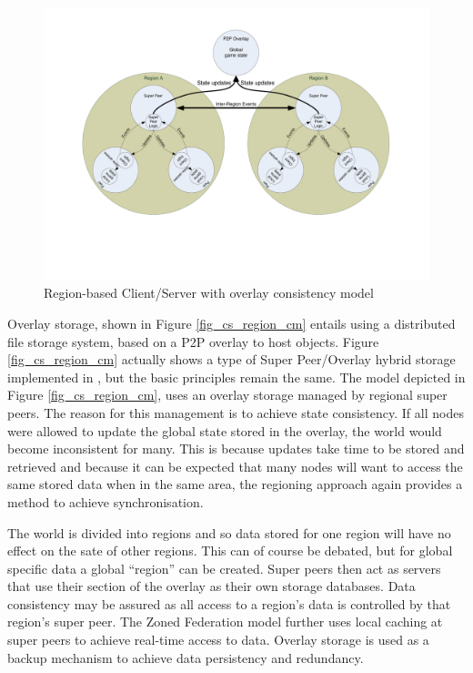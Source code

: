 \documentclass[journal,oneside,a4paper,onecolumn]{IEEEtran}
\begin{document}
\begin{figure}[htbp]
 \centering
 \includegraphics[clip=true, viewport=2cm 5cm 27cm 19.5cm, width=\columnwidth]{region_based_CS_CM_P2PO}
 \caption{Region-based Client/Server with overlay consistency model}
 \label{fig_cs_region_o_cm}
\end{figure}
%
Overlay storage, shown in Figure \ref{fig_cs_region_cm} entails using a distributed file storage system, based on a P2P overlay to host objects. Figure \ref{fig_cs_region_cm} actually shows a type of Super Peer/Overlay hybrid storage implemented in \cite{zoned_federation}, but the basic principles remain the same. The model depicted in Figure \ref{fig_cs_region_cm}, uses an overlay storage managed by regional super peers. The reason for this management is to achieve state consistency. If all nodes were allowed to update the global state stored in the overlay, the world would become inconsistent for many. This is because updates take time to be stored and retrieved and because it can be expected that many nodes will want to access the same stored data when in the same area, the regioning approach again provides a method to achieve synchronisation.

The world is divided into regions and so data stored for one region will have no effect on the sate of other regions. This can of course be debated, but for global specific data a global ``region'' can be created. Super peers then act as servers that use their section of the overlay as their own storage databases. Data consistency may be assured as all access to a region's data is controlled by that region's super peer. The Zoned Federation model further uses local caching at super peers to achieve real-time access to data. Overlay storage is used as a backup mechanism to achieve data persistency and redundancy.
\end{document}
